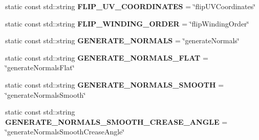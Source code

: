 \begin{DoxyCompactItemize}
\item 
\hypertarget{classrepo_1_1manipulator_1_1modelconvertor_1_1_model_import_config_a196cb90d3ef7d8b7800152ded97c73b5}{}static const std\+::string {\bfseries F\+L\+I\+P\+\_\+\+U\+V\+\_\+\+C\+O\+O\+R\+D\+I\+N\+A\+T\+E\+S} = \char`\"{}flip\+U\+V\+Coordinates\char`\"{}\label{classrepo_1_1manipulator_1_1modelconvertor_1_1_model_import_config_a196cb90d3ef7d8b7800152ded97c73b5}

\item 
\hypertarget{classrepo_1_1manipulator_1_1modelconvertor_1_1_model_import_config_a36c34f96c5ad4d81dbb9f70ef358306b}{}static const std\+::string {\bfseries F\+L\+I\+P\+\_\+\+W\+I\+N\+D\+I\+N\+G\+\_\+\+O\+R\+D\+E\+R} = \char`\"{}flip\+Winding\+Order\char`\"{}\label{classrepo_1_1manipulator_1_1modelconvertor_1_1_model_import_config_a36c34f96c5ad4d81dbb9f70ef358306b}

\item 
\hypertarget{classrepo_1_1manipulator_1_1modelconvertor_1_1_model_import_config_a567bf55463d94abaa42a6f131acf0b97}{}static const std\+::string {\bfseries G\+E\+N\+E\+R\+A\+T\+E\+\_\+\+N\+O\+R\+M\+A\+L\+S} = \char`\"{}generate\+Normals\char`\"{}\label{classrepo_1_1manipulator_1_1modelconvertor_1_1_model_import_config_a567bf55463d94abaa42a6f131acf0b97}

\item 
\hypertarget{classrepo_1_1manipulator_1_1modelconvertor_1_1_model_import_config_ab97f2e7d9c21dda9568267ce91a981b5}{}static const std\+::string {\bfseries G\+E\+N\+E\+R\+A\+T\+E\+\_\+\+N\+O\+R\+M\+A\+L\+S\+\_\+\+F\+L\+A\+T} = \char`\"{}generate\+Normals\+Flat\char`\"{}\label{classrepo_1_1manipulator_1_1modelconvertor_1_1_model_import_config_ab97f2e7d9c21dda9568267ce91a981b5}

\item 
\hypertarget{classrepo_1_1manipulator_1_1modelconvertor_1_1_model_import_config_a8b5e901666b55fea2241afb14793d0f1}{}static const std\+::string {\bfseries G\+E\+N\+E\+R\+A\+T\+E\+\_\+\+N\+O\+R\+M\+A\+L\+S\+\_\+\+S\+M\+O\+O\+T\+H} = \char`\"{}generate\+Normals\+Smooth\char`\"{}\label{classrepo_1_1manipulator_1_1modelconvertor_1_1_model_import_config_a8b5e901666b55fea2241afb14793d0f1}

\item 
\hypertarget{classrepo_1_1manipulator_1_1modelconvertor_1_1_model_import_config_af7ed06294f90863aa714a1289ec4c3d8}{}static const std\+::string {\bfseries G\+E\+N\+E\+R\+A\+T\+E\+\_\+\+N\+O\+R\+M\+A\+L\+S\+\_\+\+S\+M\+O\+O\+T\+H\+\_\+\+C\+R\+E\+A\+S\+E\+\_\+\+A\+N\+G\+L\+E} = \char`\"{}generate\+Normals\+Smooth\+Crease\+Angle\char`\"{}\label{classrepo_1_1manipulator_1_1modelconvertor_1_1_model_import_config_af7ed06294f90863aa714a1289ec4c3d8}


\end{DoxyCompactItemize}
